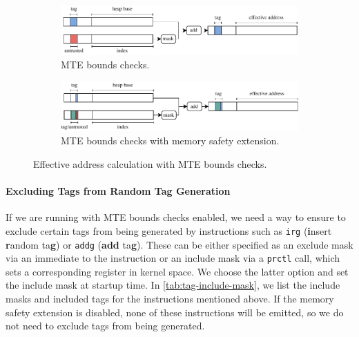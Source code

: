 \begin{figure}[t]
  \centering
  \begin{subfigure}[T]{\textwidth}
    \centering
    \includegraphics{figures/build/bounds}
    \caption{\ac{MTE} bounds checks.}
    \label{fig:mte-bounds-checks}
  \end{subfigure}
  \hfill
  \begin{subfigure}[T]{\textwidth}
    \centering
    \includegraphics{figures/build/bounds-mem-safety}
    \caption{\ac{MTE} bounds checks with memory safety extension.}
    \label{fig:mte-bounds-checks-mem-safety}
  \end{subfigure}
  \caption{Effective address calculation with \ac{MTE} bounds checks.}
  \label{fig:system-design-mem-safety-bounds}
\end{figure}

\paragraph{Excluding Tags from Random Tag Generation}
If we are running with \ac{MTE} bounds checks enabled, we need a way to ensure to exclude certain tags from being generated by instructions such as \texttt{irg} (\textbf{i}nsert \textbf{r}andom ta\textbf{g}) or \texttt{addg} (\textbf{add} ta\textbf{g}).
These can be either specified as an exclude mask via an immediate to the instruction or an include mask via a \texttt{prctl} call, which sets a corresponding register in kernel space.
We choose the latter option and set the include mask at startup time.
In \cref{tab:tag-include-mask}, we list the include masks and included tags for the instructions mentioned above.
If the memory safety extension is disabled, none of these instructions will be emitted, so we do not need to exclude tags from being generated.

